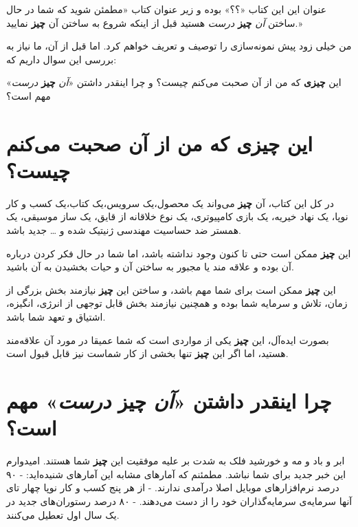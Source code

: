 عنوان این این کتاب «؟؟» بوده و زیر عنوان کتاب «مطمئن شوید که شما در حال
ساختن \emph{آن} \textbf{چیز} \emph{درست} هستید قبل از اینکه شروع به
ساختن آن \textbf{چیز} نمایید.»

من خیلی زود پیش نمونه‌سازی را توصیف و تعریف خواهم کرد. اما قبل از آن، ما
نیاز به بررسی این سوال داریم که:

این \textbf{چیزی} که من از آن صحبت می‌کنم چیست؟ و چرا اینقدر داشتن
«\emph{آن} \textbf{چیز} \emph{درست}» مهم است؟

\section{این \textbf{چیزی} که من از آن صحبت می‌کنم
چیست؟}\label{ux627ux6ccux646-ux686ux6ccux632ux6cc-ux6a9ux647-ux645ux646-ux627ux632-ux622ux646-ux635ux62dux628ux62a-ux645ux6ccux6a9ux646ux645-ux686ux6ccux633ux62a}

در کل این کتاب، آن \textbf{چیز} می‌واند یک محصول،یک سرویس،یک کتاب،یک کسب
و کار نوپا، یک نهاد خیریه، یک بازی کامپیوتری، یک نوع خلاقانه از قایق، یک
ساز موسیقی، یک همستر ضد حساسیت مهندسی ژنیتیک شده و \ldots{} جدید باشد.

این \textbf{چیز} ممکن است حتی تا کنون وجود نداشته باشد، اما شما در حال
فکر کردن درباره آن بوده و علاقه مند یا مجبور به ساختن آن و حیات بخشیدن
به آن باشید.

این \textbf{چیز} ممکن است برای شما مهم باشد، و ساختن این \textbf{چیز}
نیازمند بخش بزرگی از زمان، تلاش و سرمایه شما بوده و همچنین نیازمند بخش
قابل توجهی از انرژی، انگیزه، اشتیاق و تعهد شما باشد.

بصورت ایده‌آل، این \textbf{چیز} یکی از مواردی است که شما عمیقا در مورد
آن علاقه‌مند هستید، اما اگر این \textbf{چیز} تنها بخشی از کار شماست نیز
قابل قبول است.

\section{چرا اینقدر داشتن «\emph{آن} \textbf{چیز} \emph{درست}» مهم
است؟}\label{ux686ux631ux627-ux627ux6ccux646ux642ux62fux631-ux62fux627ux634ux62aux646-ux622ux646-ux686ux6ccux632-ux62fux631ux633ux62a-ux645ux647ux645-ux627ux633ux62a}

ابر و باد و مه و خورشید فلک به شدت بر علیه موفقیت این \textbf{چیز} شما
هستند. امیدوارم این خبر جدید برای شما نباشد. مطمئنم که آمارهای مشابه این
آمارهای شنیده‌اید: - ۹۰ درصد نرم‌افزارهای موبایل اصلا درآمدی ندارند. -
از هر پنج کسب و کار نوپا چهار تای آنها سرمایه‌ی سرمایه‌گذاران خود را از
دست می‌دهند. - ۸۰ درصد رستوران‌های جدید در یک سال اول تعطیل می‌کنند.

